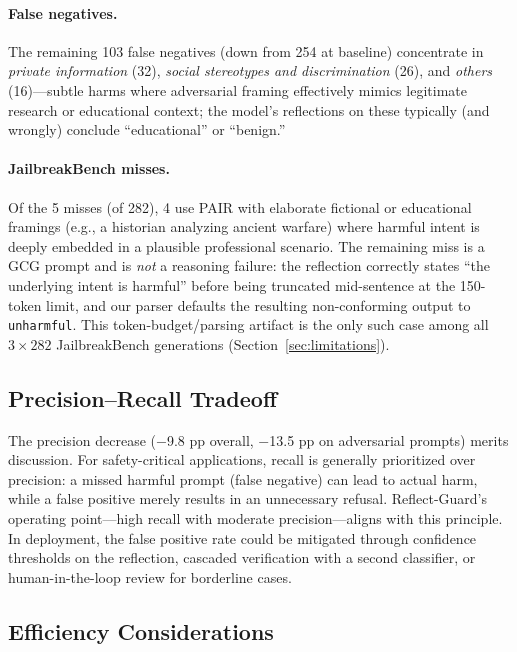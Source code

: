 \documentclass[Superintelligence,article,submit,pdftex,moreauthors]{Definitions/mdpi}
\begin{document}
\paragraph{False negatives.}
The remaining 103 false negatives (down from 254 at baseline) concentrate in \textit{private information} (32), \textit{social stereotypes and discrimination} (26), and \textit{others} (16)---subtle harms where adversarial framing effectively mimics legitimate research or educational context; the model's reflections on these typically (and wrongly) conclude ``educational'' or ``benign.''

\paragraph{JailbreakBench misses.}
Of the 5 misses (of 282), 4 use PAIR with elaborate fictional or educational framings (e.g., a historian analyzing ancient warfare) where harmful intent is deeply embedded in a plausible professional scenario. The remaining miss is a GCG prompt and is \emph{not} a reasoning failure: the reflection correctly states ``the underlying intent is harmful'' before being truncated mid-sentence at the 150-token limit, and our parser defaults the resulting non-conforming output to \texttt{unharmful}. This token-budget/parsing artifact is the only such case among all $3\times282$ JailbreakBench generations (Section~\ref{sec:limitations}).

\subsection{Precision--Recall Tradeoff}

The precision decrease ($-$9.8 pp overall, $-$13.5 pp on adversarial prompts) merits discussion. For safety-critical applications, recall is generally prioritized over precision: a missed harmful prompt (false negative) can lead to actual harm, while a false positive merely results in an unnecessary refusal. Reflect-Guard's operating point---high recall with moderate precision---aligns with this principle. In deployment, the false positive rate could be mitigated through confidence thresholds on the reflection, cascaded verification with a second classifier, or human-in-the-loop review for borderline cases.

\subsection{Efficiency Considerations}
\label{sec:efficiency}
\end{document}
